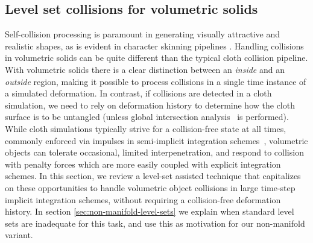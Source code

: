 \subsection{Level set collisions for volumetric solids}
\label{sec:self-collisions}


Self-collision processing is paramount in generating visually attractive and
realistic shapes, as is evident in character skinning pipelines
\citep{McAdaZSETTS:2011,VaillBGCRWGP:2013}. Handling collisions in
volumetric solids can be quite different than the typical cloth
collision pipeline. With volumetric solids there is a clear
distinction between an \emph{inside} and an \emph{outside} region,
making it possible to process collisions in a single time instance of
a simulated deformation. In contrast, if collisions are detected in a
cloth simulation, we need to rely on deformation history to determine
how the cloth surface is to be untangled (unless global intersection
analysis~\citep{BarafWK:2003} is performed). While cloth simulations
typically strive for a collision-free state at all times, commonly
enforced via impulses in semi-implicit integration
schemes~\citep{BridsMF:2003}, volumetric objects can tolerate
occasional, limited interpenetration, and respond to collision with
penalty forces which are more easily coupled with explicit integration
schemes. In this section, we review a level-set assisted technique
that capitalizes on these opportunities to handle volumetric object
collisions in large time-step implicit integration schemes, without
requiring a collision-free deformation history.  In section
\ref{sec:non-manifold-level-sets} we explain when standard level sets
are inadequate for this task, and use this as motivation for our
non-manifold variant.

